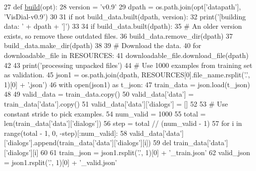 \begin{DoxyCode}
27 \textcolor{keyword}{def }\hyperlink{namespacedialog__babi__feedback_1_1build_a7a9d289f7493a5ded13c4b7f071b6184}{build}(opt):
28     version = \textcolor{stringliteral}{'v0.9'}
29     dpath = os.path.join(opt[\textcolor{stringliteral}{'datapath'}], \textcolor{stringliteral}{'VisDial-v0.9'})
30 
31     \textcolor{keywordflow}{if} \textcolor{keywordflow}{not} build\_data.built(dpath, version):
32         print(\textcolor{stringliteral}{'[building data: '} + dpath + \textcolor{stringliteral}{']'})
33 
34         \textcolor{keywordflow}{if} build\_data.built(dpath):
35             \textcolor{comment}{# An older version exists, so remove these outdated files.}
36             build\_data.remove\_dir(dpath)
37         build\_data.make\_dir(dpath)
38 
39         \textcolor{comment}{# Download the data.}
40         \textcolor{keywordflow}{for} downloadable\_file \textcolor{keywordflow}{in} RESOURCES:
41             downloadable\_file.download\_file(dpath)
42 
43         print(\textcolor{stringliteral}{'processing unpacked files'})
44         \textcolor{comment}{# Use 1000 examples from training set as validation.}
45         json1 = os.path.join(dpath, RESOURCES[0].file\_name.rsplit(\textcolor{stringliteral}{'.'}, 1)[0] + \textcolor{stringliteral}{'.json'})
46         with open(json1) \textcolor{keyword}{as} t\_json:
47             train\_data = json.load(t\_json)
48 
49         valid\_data = train\_data.copy()
50         valid\_data[\textcolor{stringliteral}{'data'}] = train\_data[\textcolor{stringliteral}{'data'}].copy()
51         valid\_data[\textcolor{stringliteral}{'data'}][\textcolor{stringliteral}{'dialogs'}] = []
52 
53         \textcolor{comment}{# Use constant stride to pick examples.}
54         num\_valid = 1000
55         total = len(train\_data[\textcolor{stringliteral}{'data'}][\textcolor{stringliteral}{'dialogs'}])
56         step = total // (num\_valid - 1)
57         \textcolor{keywordflow}{for} i \textcolor{keywordflow}{in} range(total - 1, 0, -step)[:num\_valid]:
58             valid\_data[\textcolor{stringliteral}{'data'}][\textcolor{stringliteral}{'dialogs'}].append(train\_data[\textcolor{stringliteral}{'data'}][\textcolor{stringliteral}{'dialogs'}][i])
59             del train\_data[\textcolor{stringliteral}{'data'}][\textcolor{stringliteral}{'dialogs'}][i]
60 
61         train\_json = json1.rsplit(\textcolor{stringliteral}{'.'}, 1)[0] + \textcolor{stringliteral}{'\_train.json'}
62         valid\_json = json1.rsplit(\textcolor{stringliteral}{'.'}, 1)[0] + \textcolor{stringliteral}{'\_valid.json'}

\end{DoxyCode}
